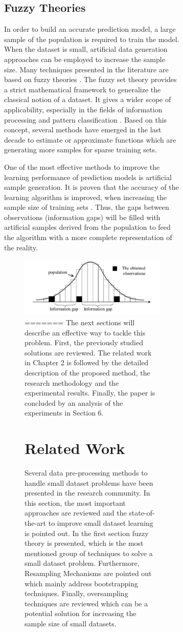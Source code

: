 \documentclass[parskip=full]{scrartcl}
\begin{document}
\begin{figure}[h]
\begin{figure}[h]
\subsection{Fuzzy Theories}
In order to build an accurate prediction model, a large sample of the population is required to train the model. When the dataset is small, artificial data generation approaches can be employed to increase the sample size.  Many techniques presented in the literature are based on fuzzy theories \cite{AbdulLateh.2017}. The fuzzy set theory provides a strict mathematical framework to generalize the classical notion of a dataset. It gives a wider scope of applicability, especially in the fields of information processing and pattern classification \cite{Zimmermann.2010}. Based on this concept, several methods have emerged in the last decade to estimate or approximate functions which are generating more samples for sparse training sets.

One of the most effective methods to improve the learning performance of prediction models is artificial sample generation. It is proven that the accuracy of the learning algorithm is improved, when increasing the sample size of training sets \cite{AbdulLateh.2017}. Thus, the gaps between observations (information gaps) will be filled with artificial samples derived from the population to feed the algorithm with a more complete representation of the reality.

\begin{figure}[h]
	\centering
	\includegraphics[width=0.6\linewidth]{"Small data distribution"}
=======
The next sections will describe an effective way to tackle this problem. First,
the previously studied solutions are reviewed. The related work in Chapter 2 is
followed by the detailed description of the proposed method, the research
methodology and the experimental results. Finally, the paper is concluded by an
analysis of the experiments in Section 6.

\section{Related Work}
Several data pre-processing methods to handle small dataset problems have been
presented in the research community. In this section, the most important
approaches are reviewed and the state-of-the-art to improve small dataset
learning is pointed out. In the first section fuzzy theory is presented, which
is the most mentioned group of techniques to solve a small dataset problem.
Furthermore, Resampling Mechanisms are pointed out which mainly address
bootstrapping techniques. Finally, oversampling techniques are reviewed which
can be a potential solution for increasing the sample size of small datasets.


\end{figure}
\end{figure}
\end{figure}
\end{document}
